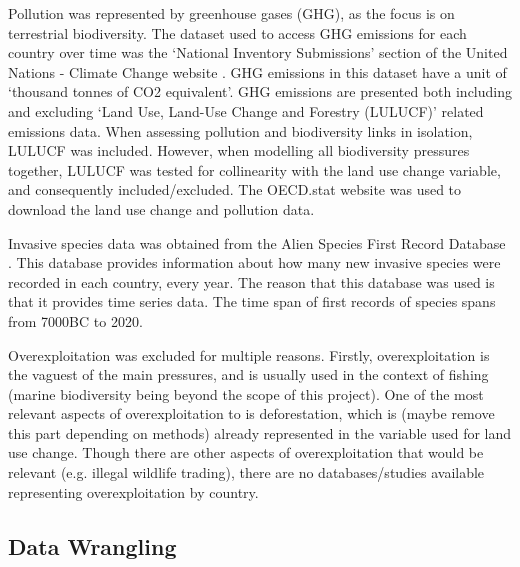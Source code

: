 \documentclass[11pt, a4paper, titlepage]{article}
\begin{document}
	Pollution was represented by greenhouse gases (GHG), as the focus is on terrestrial biodiversity. The dataset used to access GHG emissions for each country over time was the `National Inventory Submissions' section of the United Nations - Climate Change website \citep{UN2022}. GHG emissions in this dataset have a unit of `thousand tonnes of CO2 equivalent'. GHG emissions are presented both including and excluding `Land Use, Land-Use Change and Forestry (LULUCF)' related emissions data. When assessing pollution and biodiversity links in isolation, LULUCF was included. However, when modelling all biodiversity pressures together, LULUCF was tested for collinearity with the land use change variable, and consequently included/excluded. The OECD.stat website was used to download the land use change and pollution data. 
	
	Invasive species data was obtained from the Alien Species First Record Database \citep{seebens2017no, seebens2018global}. This database provides information about how many new invasive species were recorded in each country, every year. The reason that this database was used is that it provides time series data. The time span of first records of species spans from 7000BC to 2020.  
	
	Overexploitation was excluded for multiple reasons. Firstly, overexploitation is the vaguest of the main pressures, and is usually used in the context of fishing (marine biodiversity being beyond the scope of this project). One of the most relevant aspects of overexploitation to is deforestation, which is (maybe remove this part depending on methods) already represented in the variable used for land use change. Though there are other aspects of overexploitation that would be relevant (e.g. illegal wildlife trading), there are no databases/studies available representing overexploitation by country.



	
	\subsection*{Data Wrangling}
	
\end{document}
